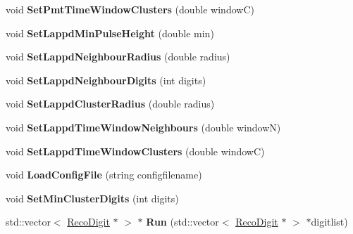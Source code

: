 \begin{DoxyCompactItemize}
\item 
\hypertarget{classHitCleaner_a5d427dd83732333d8918993e2c5a08d2}{void {\bfseries Set\-Pmt\-Time\-Window\-Clusters} (double window\-C)}\label{classHitCleaner_a5d427dd83732333d8918993e2c5a08d2}

\item 
\hypertarget{classHitCleaner_abe7877bee548ff2e72db4991ebe8d9b1}{void {\bfseries Set\-Lappd\-Min\-Pulse\-Height} (double min)}\label{classHitCleaner_abe7877bee548ff2e72db4991ebe8d9b1}

\item 
\hypertarget{classHitCleaner_a3deef1a55f3597115b7a1514c23ab2b4}{void {\bfseries Set\-Lappd\-Neighbour\-Radius} (double radius)}\label{classHitCleaner_a3deef1a55f3597115b7a1514c23ab2b4}

\item 
\hypertarget{classHitCleaner_af872da7d231440f4fa75b2dfe6be5fc8}{void {\bfseries Set\-Lappd\-Neighbour\-Digits} (int digits)}\label{classHitCleaner_af872da7d231440f4fa75b2dfe6be5fc8}

\item 
\hypertarget{classHitCleaner_aacf88b73ee3bb0bb4afa4648c64add65}{void {\bfseries Set\-Lappd\-Cluster\-Radius} (double radius)}\label{classHitCleaner_aacf88b73ee3bb0bb4afa4648c64add65}

\item 
\hypertarget{classHitCleaner_aaa0aca2da3c1a4670e9a4a1361e9b124}{void {\bfseries Set\-Lappd\-Time\-Window\-Neighbours} (double window\-N)}\label{classHitCleaner_aaa0aca2da3c1a4670e9a4a1361e9b124}

\item 
\hypertarget{classHitCleaner_a093989b06deb5743b6c4c81092e69ceb}{void {\bfseries Set\-Lappd\-Time\-Window\-Clusters} (double window\-C)}\label{classHitCleaner_a093989b06deb5743b6c4c81092e69ceb}

\item 
\hypertarget{classHitCleaner_a6f25436f395cb868857f7a4b5c418de2}{void {\bfseries Load\-Config\-File} (string configfilename)}\label{classHitCleaner_a6f25436f395cb868857f7a4b5c418de2}

\item 
\hypertarget{classHitCleaner_a1154c24324e11dc8d0d53bcd806d7113}{void {\bfseries Set\-Min\-Cluster\-Digits} (int digits)}\label{classHitCleaner_a1154c24324e11dc8d0d53bcd806d7113}

\item 
\hypertarget{classHitCleaner_ae47191a46b30d5345b1e1c422767f816}{std\-::vector$<$ \hyperlink{classRecoDigit}{Reco\-Digit} $\ast$ $>$ $\ast$ {\bfseries Run} (std\-::vector$<$ \hyperlink{classRecoDigit}{Reco\-Digit} $\ast$ $>$ $\ast$digitlist)}\label{classHitCleaner_ae47191a46b30d5345b1e1c422767f816}


\end{DoxyCompactItemize}
